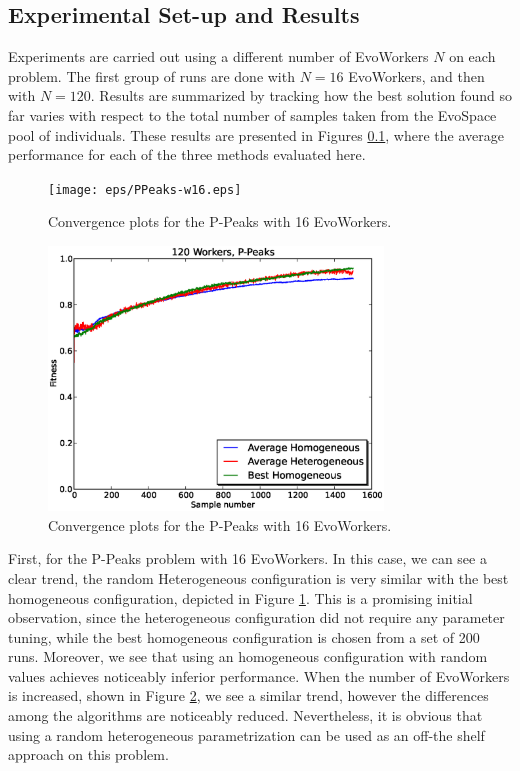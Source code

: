 \documentclass{sig-alternate}
\begin{document}
\subsection{Experimental Set-up and Results}
Experiments are carried out using a different number of EvoWorkers $N$ on each problem.
The first group of runs are done with $N=16$ EvoWorkers, and then with $N=120$.
Results are summarized by tracking how the best solution found so far varies with respect to the total
number of samples taken from the EvoSpace pool of individuals.
These results are presented in Figures \ref{}, where the average performance for
each of the three methods evaluated here.

\begin{figure}[t]
\centering
\texttt{[image: eps/PPeaks-w16.eps]}
\caption{Convergence plots for the P-Peaks with 16 EvoWorkers.}
\label{fig:PPeaks-w16}
\end{figure}

\begin{figure}[t]
\centering
\includegraphics[width=3.5in]{eps/PPeaks-w120.eps}
\caption{Convergence plots for the P-Peaks with 16 EvoWorkers.}
\label{fig:PPeaks-w120}
\end{figure}


First, for the P-Peaks problem with 16 EvoWorkers.
In this case, we can see a clear trend, the random Heterogeneous configuration is very similar with the best homogeneous configuration,
depicted in Figure \ref{fig:PPeaks-w16}.
This is a promising initial observation, since the heterogeneous configuration did not require any parameter tuning, while the best homogeneous configuration
is chosen from a set of 200 runs.
Moreover, we see that using an homogeneous configuration with random values achieves noticeably inferior performance.
When the number of EvoWorkers is increased, shown in Figure \ref{fig:PPeaks-w120}, we see a similar trend,
however the differences among the algorithms are noticeably reduced.
Nevertheless, it is obvious that using a random heterogeneous parametrization can be used as an off-the shelf approach on this problem.
\end{document}
